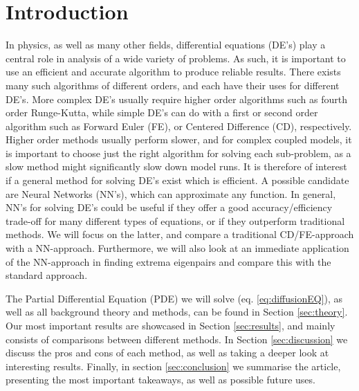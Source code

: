 \section{Introduction}
\label{sec:introduction}
In physics, as well as many other fields, differential equations (DE's) play a central role in analysis of a wide variety of problems. As such, it is important to use an efficient and accurate algorithm to produce reliable results. There exists many such algorithms of different orders, and each have their uses for different DE's. More complex DE's usually require higher order algorithms such as fourth order Runge-Kutta, while simple DE's can do with a first or second order algorithm such as Forward Euler (FE), or Centered Difference (CD), respectively. Higher order methods usually perform slower, and for complex coupled models, it is important to choose just the right algorithm for solving each sub-problem, as a slow method might significantly slow down model runs. It is therefore of interest if a general method for solving DE's exist which is efficient. A possible candidate are Neural Networks (NN's), which can approximate any function. In general, NN's for solving DE's could be useful if they offer a good accuracy/efficiency trade-off for many different types of equations, or if they outperform traditional methods. We will focus on the latter, and compare a traditional CD/FE-approach with a NN-approach. Furthermore, we will also look at an immediate application of the NN-approach in finding extrema eigenpairs \citep{yi2004neural} and compare this with the standard approach.

The Partial Differential Equation (PDE) we will solve (eq. \ref{eq:diffusionEQ}), as well as all background theory and methods, can be found in Section \ref{sec:theory}. Our most important results are showcased in Section \ref{sec:results}, and mainly consists of comparisons between different methods. In Section \ref{sec:discussion} we discuss the pros and cons of each method, as well as taking a deeper look at interesting results. Finally, in section \ref{sec:conclusion} we summarise the article, presenting the most important takeaways, as well as possible future uses.
